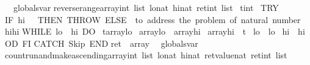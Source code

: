 \begin{isabellebody}
\ {\isacharparenleft}\ globals{\isacharunderscore}var{\isacharparenright}\isanewline
reverse{\isacharunderscore}range{\isacharparenleft}array{\isacharcolon}{\isacharcolon}{\isachardoublequoteopen}int\ list{\isachardoublequoteclose}{\isacharcomma}\ lo{\isacharcolon}{\isacharcolon}nat{\isacharcomma}\ hi{\isacharcolon}{\isacharcolon}nat{\isacharbar}\ ret{\isacharcolon}{\isacharcolon}{\isachardoublequoteopen}int\ list{\isachardoublequoteclose}{\isacharparenright}\isanewline
{}\ t{\isacharcolon}{\isacharcolon}int\ \isanewline
{\isachardoublequoteopen}\isanewline
TRY\isanewline
IF\ {\isasymacute}hi\ {\isacharequal}\ {}\ THEN\ THROW\ ELSE\ {\isacharparenleft}{\isacharasterisk}\ to\ address\ the\ problem\ of\ natural\ number\ {\isacharasterisk}{\isacharparenright}\isanewline
{\isasymacute}hi{\isacharcolon}{\isacharequal}{\isacharequal}{\isasymacute}hi{\isacharminus}{}{\isacharsemicolon}{\isacharsemicolon}\isanewline
WHILE\ {\isasymacute}lo\ {\isacharless}\ {\isasymacute}hi\ DO\isanewline
\ {\isasymacute}t{\isacharcolon}{\isacharequal}{\isacharequal}{\isasymacute}array{\isacharbang}{\isasymacute}lo{\isacharsemicolon}{\isacharsemicolon}\isanewline
\ {\isasymacute}array{\isacharbang}{\isasymacute}lo\ {\isacharcolon}{\isacharequal}{\isacharequal}\ {\isasymacute}array{\isacharbang}{\isasymacute}hi{\isacharsemicolon}{\isacharsemicolon}\isanewline
\ {\isasymacute}array{\isacharbang}{\isasymacute}hi\ {\isacharcolon}{\isacharequal}{\isacharequal}\ {\isasymacute}t{\isacharsemicolon}{\isacharsemicolon}\isanewline
\ {\isasymacute}lo\ {\isacharcolon}{\isacharequal}{\isacharequal}\ {\isasymacute}lo{\isacharplus}{}{\isacharsemicolon}{\isacharsemicolon}\isanewline
\ {\isasymacute}hi\ {\isacharcolon}{\isacharequal}{\isacharequal}\ {\isasymacute}hi{\isacharminus}{}\isanewline
OD\ FI\isanewline
CATCH\ Skip\ END{\isacharsemicolon}{\isacharsemicolon}\isanewline
{\isasymacute}ret\ {\isacharcolon}{\isacharequal}{\isacharequal}\ {\isasymacute}array{\isachardoublequoteclose}\isanewline
\isanewline
{}\isamarkupfalse%
\ {\isacharparenleft}\ globals{\isacharunderscore}var{\isacharparenright}\isanewline
count{\isacharunderscore}run{\isacharunderscore}and{\isacharunderscore}make{\isacharunderscore}ascending{\isacharparenleft}array{\isacharcolon}{\isacharcolon}{\isachardoublequoteopen}int\ list{\isachardoublequoteclose}{\isacharcomma}\ lo{\isacharcolon}{\isacharcolon}nat{\isacharcomma}\ hi{\isacharcolon}{\isacharcolon}nat{\isacharbar}\ ret{\isacharunderscore}value{\isacharcolon}{\isacharcolon}nat{\isacharcomma}\ ret{\isacharcolon}{\isacharcolon}{\isachardoublequoteopen}int\ list{\isachardoublequoteclose}{\isacharparenright}\isanewline

\end{isabellebody}
